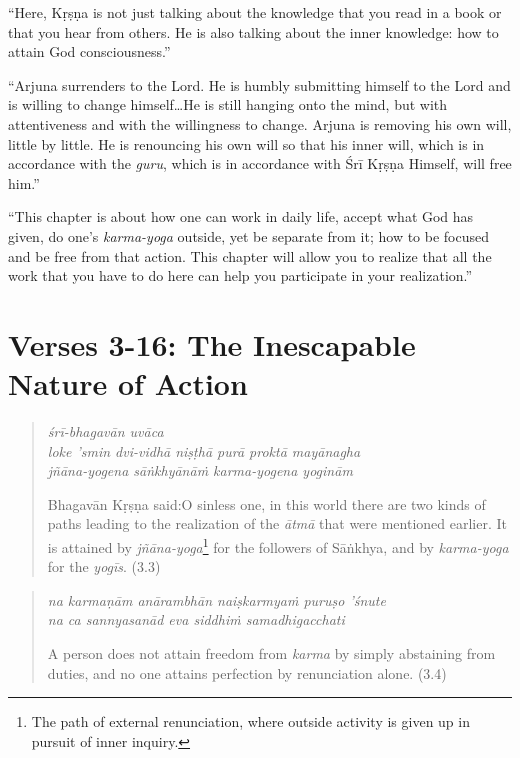 \documentclass[12pt, twoside, openright]{memoir}
\begin{document}
\enquote{Here, Kṛṣṇa is not just talking about the knowledge that you read in a book or that you hear from others. He is also talking about the inner knowledge: how to attain God consciousness.}

\enquote{Arjuna surrenders to the Lord. He is humbly submitting himself to the Lord and is willing to change himself\ldots He is still hanging onto the mind, but with attentiveness and with the willingness to change. Arjuna is removing his own will, little by little. He is renouncing his own will so that his inner will, which is in accordance with the \textit{guru}, which is in accordance with Śrī Kṛṣṇa Himself, will free him.}

\enquote{This chapter is about how one can work in daily life, accept what God has given, do one’s \textit{karma-yoga} outside, yet be separate from it; how to be focused and be free from that action. This chapter will allow you to realize that all the work that you have to do here can help you participate in your realization.}


\section{Verses 3-16: The Inescapable Nature of Action}\label{sec-verses-3-16-the-inescapable-nature-of-action}

\par
\begin{verse}
\textit{śrī-bhagavān uvāca} \\
\textit{loke ’smin dvi-vidhā niṣṭhā purā proktā mayānagha} \\
\textit{jñāna-yogena sāṅkhyānāṁ karma-yogena yoginām}

\noindent \quad Bhagavān Kṛṣṇa said:\linebreak O sinless one, in this world there are two kinds of paths leading to the realization of the \textit{ātmā} that were mentioned earlier. It is attained by \textit{jñāna-yoga}\footnote{The path of external renunciation, where outside activity is given up in pursuit of inner inquiry.} for the followers of Sāṅkhya, and by \textit{karma-yoga} for the \textit{yogīs}. (3.3)
\end{verse}
\par



\par
\begin{verse}
\textit{na karmaṇām anārambhān naiṣkarmyaṁ puruṣo ’śnute} \\
\textit{na ca sannyasanād eva siddhiṁ samadhigacchati}

\noindent A person does not attain freedom from \textit{karma} by simply abstaining from duties, and no one attains perfection by renunciation alone. (3.4)
\end{verse}
\par
\end{document}
